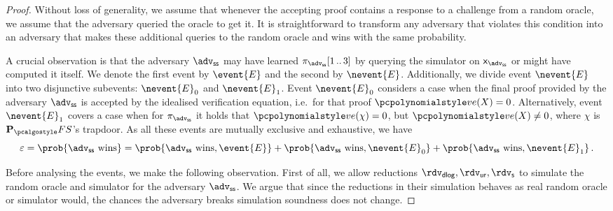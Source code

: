 \documentclass[runningheads,11pt]{llncs}
\theoremstyle{definition}
\begin{document}
\begin{proof}
Without loss of generality, we assume that whenever the accepting proof contains a response to a challenge from a random oracle, we assume that the adversary queried the oracle to get it. 
It is straightforward to transform any adversary that violates this condition into an adversary that makes these additional queries to the random oracle and wins with the same probability.

A crucial observation is that the adversary $\advss$ may have learned $\zkproof_{\advss}\range{1}{3}$ by querying the simulator on $\inp_{\advss}$ or might have computed it itself. We denote the first event by $\event{E}$ and the second by $\nevent{E}$. 
%
Additionally, we divide event $\nevent{E}$ into two disjunctive subevents: $\nevent{E}_0$ and $\nevent{E}_1$. 
Event $\nevent{E}_0$ considers a case when the final proof provided by the adversary $\advss$ is accepted by the idealised verification equation, i.e.~for that proof $\vereq(X) = 0$. 
Alternatively, event $\nevent{E}_1$ covers a case when for $\zkproof_\advss$ it
holds that $\vereq(\chi) = 0$, but $\vereq(X) \neq 0$, where $\chi$ is $\plonkprotfs$'s trapdoor.
%
As all these events are mutually exclusive and exhaustive, we have
\[
	\eps = \prob{\advss \text{ wins}} = \prob{\advss \text{ wins}, \event{E}} + \prob{\advss \text{ wins}, \nevent{E}_0} + \prob{\advss \text{ wins}, \nevent{E}_1}\,.
\]


Before analysing the events, we make the following observation.
First of all, we allow reductions $\rdv_\dlog, \rdvur, \rdvs$ to simulate the random oracle and simulator for the adversary $\advss$. We argue that since the reductions in their simulation behaves as real random oracle or simulator would, the chances the adversary breaks simulation soundness does not change. 


\end{proof}
\end{document}
